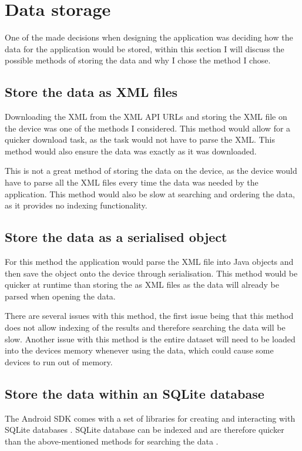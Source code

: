 \section{Data storage}
One of the made decisions when designing the application was deciding how the data for the application would be stored, within this section I will discuss the possible methods of storing the data and why I chose the method I chose.

\subsection{Store the data as XML files}

Downloading the XML from the XML API URLs and storing the XML file \cite{xml} on the device was one of the methods I considered. This method would allow for a quicker download task, as the task would not have to parse the XML. This method would also ensure the data was exactly as it was downloaded.

This is not a great method of storing the data on the device, as the device would have to parse all the XML files every time the data was needed by the application. This method would also be slow at searching and ordering the data, as it provides no indexing functionality.

\subsection{Store the data as a serialised object}

For this method the application would parse the XML file \cite{xml} into Java \cite{java} objects and then save the object onto the device through serialisation. This method would be quicker at runtime than storing the as XML files as the data will already be parsed when opening the data. 

There are several issues with this method, the first issue being that this method does not allow indexing of the results and therefore searching the data will be slow. Another issue with this method is the entire dataset will need to be loaded into the devices memory whenever using the data, which could cause some devices to run out of memory.

\subsection{Store the data within an SQLite database}

The Android SDK \cite{android_sdk} comes with a set of libraries for creating and interacting with SQLite databases \cite{sqlite}. SQLite database can be indexed and are therefore quicker than the above-mentioned methods for searching the data \cite{sqlite}. 

